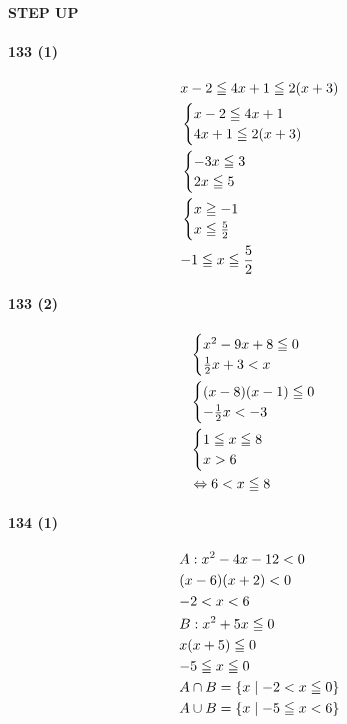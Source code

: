 \documentclass[fleqn,a4j,dvipdfmx,uplatex,twocolumn]{jsarticle}
\def\nr{\notag\\}%
\begin{document}
\clearpage
\begin{center}
  \textbf{STEP UP}\\
\end{center}

\paragraph{133 (1)}
\begin{align*}
  &x-2 \leqq 4x+1 \leqq 2(x+3) \nr
  &\begin{cases} x-2 \leqq 4x+1 \\ 4x+1 \leqq 2(x+3) \end{cases} \nr
  &\begin{cases} -3x \leqq 3 \\ 2x \leqq 5 \end{cases} \nr
  &\begin{cases} x \geqq -1 \\ x \leqq \frac{5}{2} \end{cases} \nr
  &{-}1 \leqq x \leqq \frac{5}{2}
\end{align*}

\paragraph{133 (2)}
\begin{align*}
  &\begin{cases} x^2-9x+8 \leqq 0 \\ \frac{1}{2}x+3 < x \end{cases} \nr
  &\begin{cases} (x-8)(x-1) \leqq 0 \\ -\frac{1}{2}x < -3 \end{cases} \nr
  &\begin{cases} 1 \leqq x \leqq 8 \\ x > 6 \end{cases} \nr
  &\Leftrightarrow 6 < x \leqq 8
\end{align*}

\paragraph{134 (1)}
\begin{align*}
  &A: x^2-4x-12 < 0 \nr
  &(x-6)(x+2) < 0 \nr
  &{-}2 < x < 6 \nr
  &B: x^2+5x \leqq 0 \nr
  &x(x+5) \leqq 0 \nr
  &{-}5 \leqq x \leqq 0 \nr
  &A \cap B = \{x \mid -2 < x \leqq 0\} \nr
  &A \cup B = \{x \mid -5 \leqq x < 6\}
\end{align*}
\end{document}
